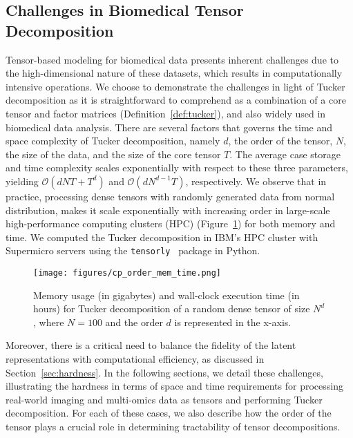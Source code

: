 


\subsection{Challenges in Biomedical Tensor Decomposition}\label{sec:challenges}

Tensor-based modeling for biomedical data presents inherent challenges due to the high-dimensional nature of these datasets, which results in computationally intensive operations. We choose to demonstrate the challenges in light of Tucker decomposition as it is straightforward to comprehend as a combination of a core tensor and factor matrices (Definition~\ref{def:tucker}), and also widely used in biomedical data analysis. There are several factors that governs the time and space complexity of Tucker decomposition, namely $d$, the order of the tensor, $N$, the size of the data, and the size of the core tensor $T$. The average case storage and time complexity scales exponentially with respect to these three parameters, yielding $\mathcal{O}(dNT+T^d)$ and $\mathcal{O}(dN^{d-1}T)$, respectively. We observe that in practice, processing dense tensors with randomly generated data from normal distribution, makes it scale exponentially with increasing order in large-scale high-performance computing clusters (HPC) (Figure~\ref{fig:mem-time}) for both memory and time. We computed the Tucker decomposition in IBM's HPC cluster with Supermicro servers using the \texttt{tensorly}~\cite{kossaifi2019tensorly} package in Python. 
\begin{figure}[htbp]
    \centering
    \texttt{[image: figures/cp\_order\_mem\_time.png]}
    \caption{Memory usage (in gigabytes) and wall-clock execution time (in hours) for Tucker decomposition of a random dense tensor of size $N^d$, where $N=100$ and the order $d$ is represented in the x-axis.}
    \label{fig:mem-time}
\end{figure}
Moreover, there is a critical need to balance the fidelity of the latent representations with computational efficiency, as discussed in Section~\ref{sec:hardness}. In the following sections, we detail these challenges, illustrating the hardness in terms of space and time requirements for processing real-world imaging and multi-omics data as tensors and performing Tucker decomposition. For each of these cases, we also describe how the order of the tensor plays a crucial role in determining tractability of tensor decompositions.

